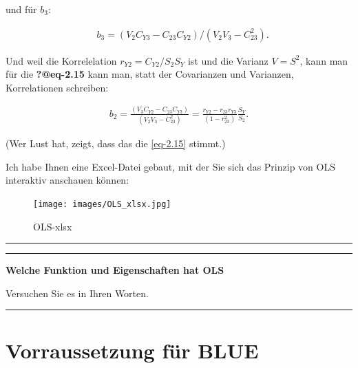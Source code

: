 \documentclass[
  10pt,
  letterpaper,
  a4paper, twoside]{scrreprt}
\begin{document}
\begin{tcolorbox}
und für \(b_3\):

\begin{align}
& b_3=\left(V_2 C_{Y 3}-C_{23} C_{Y 2}\right) /\left(V_2 V_3-C_{23}^2\right) . \label{eq-2.16}
\end{align}

Und weil die Korrelelation \(r_{Y 2} = C_{Y 2} / S_2S_Y\) ist und die
Varianz \(V = S^2\), kann man für die \textbf{?@eq-2.15} kann man, statt
der Covarianzen und Varianzen, Korrelationen schreiben:

\begin{align}
b_2 = \frac{\left(V_3 C_{Y 2}-C_{23} C_{Y 3}\right)}{\left(V_2 V_3-C_{23}^2\right)}=\frac{r_{Y 2}-r_{23} r_{Y 3}}{\left(1-r_{23}^2\right)} \frac{S_Y}{S_2} . \label{eq-2.15}
\end{align}

(Wer Lust hat, zeigt, dass das die \eqref{eq-2.15} stimmt.)

\end{tcolorbox}

Ich habe Ihnen eine Excel-Datei gebaut, mit der Sie sich das Prinzip von
OLS interaktiv anschauen können:

\begin{figure}[H]

{\centering \texttt{[image: images/OLS\_xlsx.jpg]}

}

\caption{OLS-xlsx}

\end{figure}%

\begin{center}\rule{0.5\linewidth}{0.5pt}\end{center}

\begin{center}\rule{0.5\linewidth}{0.5pt}\end{center}

\textbf{Welche Funktion und Eigenschaften hat OLS}

Versuchen Sie es in Ihren Worten.

\begin{center}\rule{0.5\linewidth}{0.5pt}\end{center}

\clearpage

\section{Vorraussetzung für BLUE}\label{vorraussetzung-fuxfcr-blue}
\end{document}
